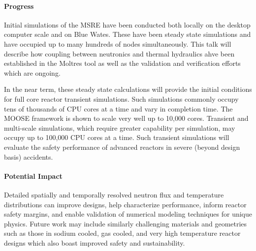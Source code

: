 \documentclass[11pt]{article}
\begin{document}
\paragraph{Progress}

Initial simulations of the MSRE have been conducted both locally on the desktop 
computer scale and on Blue Wates. These have been steady state simulations and 
have occupied up to many hundreds of nodes simultaneously. This talk will 
describe how coupling between neutronics and thermal hydraulics ahve been 
established in the Moltres tool as well as the validation and verification 
efforts which are ongoing.  

In the near term, these steady state calculations will provide the initial 
conditions for full core reactor transient simulations. Such simulations 
commonly occupy tens of thousands of CPU cores at a time and vary in completion 
time. The MOOSE framework is shown to scale very well up to 10,000 cores. 
Transient and multi-scale simulations, which require greater capability per 
simulation, may occupy up to 100,000 CPU cores at a time. Such transient 
simulations will evaluate the safety performance of advanced reactors in severe 
(beyond design basis) accidents.

\paragraph{Potential Impact}
Detailed spatially and temporally resolved neutron flux and
temperature distributions can improve designs, help characterize
performance, inform reactor safety margins, and enable validation of numerical
modeling techniques for unique physics.
Future work may include similarly challenging materials and geometries such as
those in sodium cooled, gas cooled, and very high temperature reactor designs
which also boast improved safety and sustainability.
\end{document}
